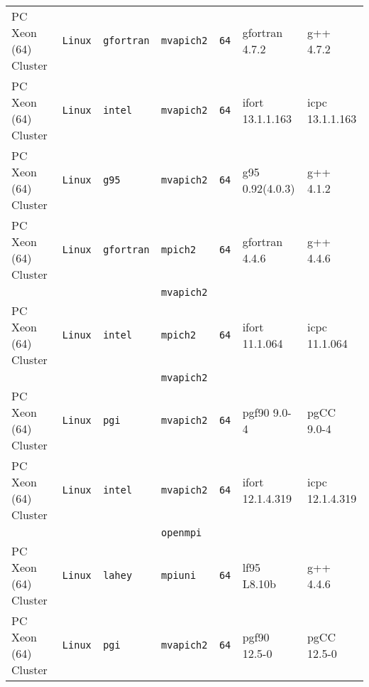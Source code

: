 \begin{longtable}{lllllll}
PC Xeon (64) Cluster  &\tt Linux  &\tt gfortran     &\tt mvapich2   &\tt 64              & gfortran \footnotesize 4.7.2       & g++ \footnotesize 4.7.2         \\ %
PC Xeon (64) Cluster  &\tt Linux  &\tt intel        &\tt mvapich2   &\tt 64              & ifort \footnotesize 13.1.1.163     & icpc \footnotesize 13.1.1.163   \\ %
PC Xeon (64) Cluster  &\tt Linux  &\tt g95          &\tt mvapich2   &\tt 64              & g95 \footnotesize 0.92(4.0.3)      & g++ \footnotesize 4.1.2         \\ %
PC Xeon (64) Cluster  &\tt Linux  &\tt gfortran     &\tt mpich2     &\tt 64              & gfortran \footnotesize 4.4.6       & g++ \footnotesize 4.4.6         \\ %
                      &           &                 &\tt mvapich2   &                    &                                    &                                 \\
PC Xeon (64) Cluster  &\tt Linux  &\tt intel        &\tt mpich2     &\tt 64              & ifort \footnotesize 11.1.064       & icpc \footnotesize 11.1.064     \\ %
                      &           &                 &\tt mvapich2   &                    &                                    &                                 \\
PC Xeon (64) Cluster  &\tt Linux  &\tt pgi          &\tt mvapich2   &\tt 64              & pgf90 \footnotesize 9.0-4          & pgCC \footnotesize 9.0-4        \\ %
PC Xeon (64) Cluster  &\tt Linux  &\tt intel        &\tt mvapich2   &\tt 64              & ifort \footnotesize 12.1.4.319     & icpc \footnotesize 12.1.4.319   \\ %
                      &           &                 &\tt openmpi    &                    &                                    &                                 \\
PC Xeon (64) Cluster  &\tt Linux  &\tt lahey        &\tt mpiuni     &\tt 64              & lf95 \footnotesize L8.10b          & g++ \footnotesize 4.4.6         \\ %
PC Xeon (64) Cluster  &\tt Linux  &\tt pgi          &\tt mvapich2   &\tt 64              & pgf90 \footnotesize 12.5-0         & pgCC \footnotesize 12.5-0       \\ %

\end{longtable}
